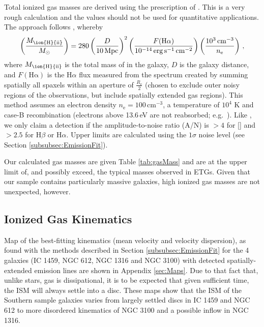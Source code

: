 \documentclass[a4paper,fleqn,usenatbib]{mnras}
\begin{document}
	Total ionized gas masses are derived using the prescription of \citet{Sarzi2005}. This is a very rough calculation and the values should not be used for quantitative applications. The approach follows \citet{Kim1989}, whereby
	\begin{equation}
		\left(\frac{M_\text{\ion{H}{ii}}}{M_\odot}\right) = 280 \left(\frac{D}{10\, \mathrm{Mpc}}\right)^2 \left(\frac{F(\mathrm{H\alpha})}{10^{-14} \, \mathrm{erg \, s^{-1} \, cm^{-2}}}\right) \left(\frac{10^3 \, \mathrm{cm^{-3}}}{n_\mathrm{e}}\right) \, ,
	\end{equation}
	where $M_\text{\ion{H}{ii}}$ is the total mass of  in the galaxy, $D$ is the galaxy distance, and $F(\mathrm{H\alpha})$ is the H$\alpha$ flux measured from the spectrum created by summing spatially all spaxels within an aperture of $\frac{R_\mathrm{e}}{2}$ (chosen to exclude outer noisy regions of the observations, but include spatially extended gas regions). This method assumes an electron density $n_\mathrm{e} = 100 \, \mathrm{cm^{-3}}$, a temperature of $10^4$ K and case-B recombination (electrons above 13.6\,eV are not reabsorbed; e.g.\ \citealt[p.\,74]{Osterbrock1974}). Like \citet{Sarzi2005}, we only claim a detection if the amplitude-to-noise ratio (A/N) is $>4$ for [] and $>2.5$ for H$\beta$ or H$\alpha$. Upper limits are calculated using the $1\sigma$ noise level (see Section \ref{subsubsec:EmissionFit}).

	Our calculated gas masses are given Table \ref{tab:gasMass} and are at the upper limit of, and possibly exceed, the typical masses observed in ETGs. Given that our sample contains particularly massive galaxies, high ionized gas masses are not unexpected, however.

	\subsection{Ionized Gas Kinematics}
		\label{subsec:GasKin}
		Map of the best-fitting kinematics (mean velocity and velocity dispersion), as found with the methods described in Section \ref{subsubsec:EmissionFit} for the 4 galaxies (IC 1459, NGC 612, NGC 1316 and NGC 3100) with detected spatially-extended emission lines are shown in Appendix \ref{sec:Maps}. Due to that fact that, unlike stars, gas is dissipational, it is to be expected that given sufficient time, the ISM will always settle into a disc. These maps show that the ISM of the Southern sample galaxies varies from largely settled discs in IC 1459 and NGC 612 to more disordered kinematics of NGC 3100 and a possible inflow in NGC 1316.
\end{document}
